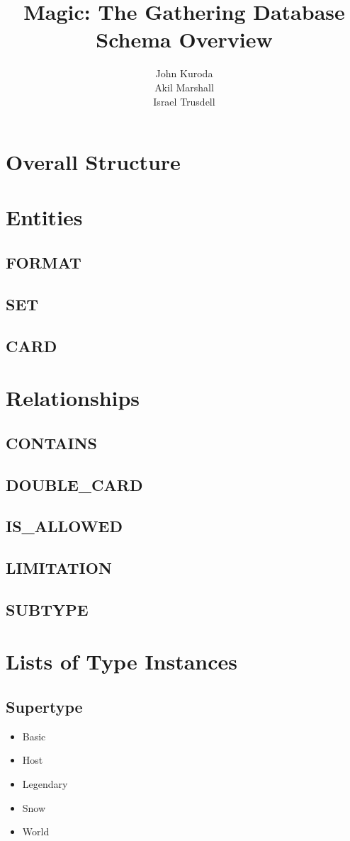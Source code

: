 \documentclass{article}
\title{Magic: The Gathering Database Schema Overview}
\author{John Kuroda\\Akil Marshall\\Israel Trusdell}
\begin{document}
\maketitle
\section{Overall Structure}
\section{Entities}
\subsection{FORMAT}
\subsection{SET}
\subsection{CARD}
\section{Relationships}
\subsection{CONTAINS}
\subsection{DOUBLE\_CARD}
\subsection{IS\_ALLOWED}
\subsection{LIMITATION}
\subsection{SUBTYPE}
\section{Lists of Type Instances}
\subsection{Supertype}
\begin{multicols}{3}
    \begin{itemize}
        \item Basic
        \item Host
        \item Legendary
        \item Snow
        \item World
    \end{itemize}
\end{multicols}
\end{document}
